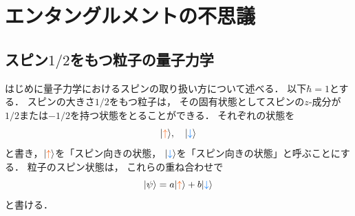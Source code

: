 \documentclass[
]{sotsu}
\newcommand{\bitone}{\mathcolor{fire}{\uparrow}}
\newcommand{\bittwo}{\mathcolor{water}{\downarrow}}
\let\upspin\bitone
\let\dwspin\bittwo
\begin{document}
\section{エンタングルメントの不思議}


\subsection{スピン\texorpdfstring{$1/2$}{½}をもつ粒子の量子力学}

はじめに量子力学におけるスピンの取り扱い方について述べる．
以下$\hbar = 1$とする．
スピンの大きさ$1/2$をもつ粒子は，
その固有状態としてスピンの$z$-成分が$1/2$または$-1/2$を持つ状態をとることができる．
それぞれの状態を
\begin{equation}
    \label{eq:spin-basis}
    \ket{\upspin}, \quad \ket{\dwspin}
\end{equation}
と書き，$\ket{\upspin}$を「スピン向きの状態，
$\ket{\dwspin}$を「スピン向きの状態」と呼ぶことにする．
粒子のスピン状態は，
これらの重ね合わせで
\begin{equation}
    \label{eq:spin-state}
    \ket{\psi} = a \ket{\upspin} + b \ket{\dwspin}
\end{equation}
と書ける．
\end{document}
